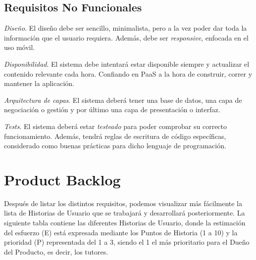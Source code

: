 \subsection{Requisitos No Funcionales}

\begin{enumerate}
    { \renewcommand\labelenumi{R.N. \theenumi}
    \item
    \textit{Diseño}. El diseño debe ser sencillo, minimalista, pero a la vez poder dar toda la información que el usuario requiera. Además, debe ser \textit{responsive}, enfocada en el uso móvil.
    \item
    \textit{Disponibilidad}. El sistema debe intentará estar disponible siempre y actualizar el contenido relevante cada hora. Confiando en \ac{PaaS} a la hora de construir, correr y mantener la aplicación.
    \item
    \textit{Arquitectura de capas}. El sistema deberá tener una base de datos, una capa de negociación o gestión y por último una capa de presentación o interfaz.
    \item
    \textit{Tests}. El sistema deberá estar \textit{testeado} para poder comprobar su correcto funcionamiento. Además, tendrá reglas de escritura de código específicas, considerado como buenas prácticas para dicho lenguaje de programación.
}\end{enumerate}

\newpage

\section{Product Backlog}
Después de listar los distintos requisitos, podemos visualizar más fácilmente la lista de Historias de Usuario que se trabajará y desarrollará posteriormente. La siguiente tabla contiene las diferentes Historias de Usuario, donde la estimación del esfuerzo (E) está expresada mediante los Puntos de Historia (1 a 10) y la prioridad (P) representada del 1 a 3, siendo el 1 el más prioritario para el Dueño del Producto, es decir, los tutores.

